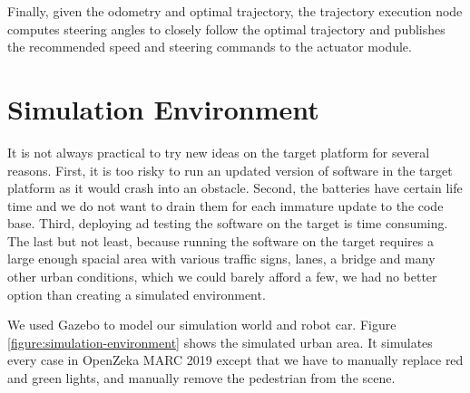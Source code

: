 Finally, given the odometry and optimal trajectory, the trajectory execution
node computes steering angles to closely follow the optimal trajectory and
publishes the recommended speed and steering commands to the actuator module.

\section{Simulation Environment}

It is not always practical to try new ideas on the target platform for several
reasons. First, it is too risky to run an updated version of software in the
target platform as it would crash into an obstacle. Second, the batteries have
certain life time and we do not want to drain them for each immature update to
the code base. Third, deploying ad testing the software on the target is time
consuming. The last but not least, because running the software on the target
requires a large enough spacial area with various traffic signs, lanes, a
bridge and many other urban conditions, which we could barely afford a few, we
had no better option than creating a simulated environment.

We used Gazebo to model our simulation world and robot car. Figure
\ref{figure:simulation-environment} shows the simulated urban area. It
simulates every case in OpenZeka MARC 2019 except that we have to manually
replace red and green lights, and manually remove the pedestrian from the
scene.

